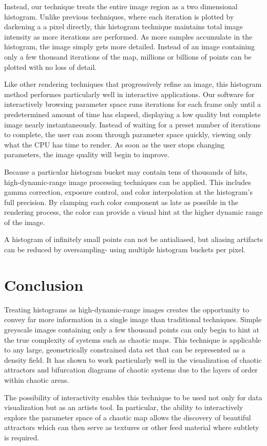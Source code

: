 \documentclass{acmsiggraph}
\begin{document}
Instead, our technique treats the entire image region as a two dimensional
histogram. Unlike previous techniques, where each iteration is plotted by
darkening a a pixel directly, this histogram technique maintains total image
intensity as more iterations are performed. As more samples accumulate in the
histogram, the image simply gets more detailed. Instead of an image containing
only a few thousand iterations of the map, millions or billions of points can
be plotted with no loss of detail.

Like other rendering techniques that progressively refine an image, this
histogram method performes particularly well in interactive applications.
Our software for interactively browsing parameter space runs iterations
for each frame only until a predetermined amount of time has elapsed,
displaying a low quality but complete image nearly instantaneously.
Instead of waiting for a preset number of iterations to complete, the user
can zoom through parameter space quickly, viewing only what the CPU has time
to render. As soon as the user stops changing parameters, the image quality
will begin to improve.

Because a particular histogram bucket may contain tens of thousands of hits,
high-dynamic-range image processing techniques can be applied. This includes
gamma correction, exposure control, and color interpolation at the histogram's
full precision. By clamping each color component as late as possible in the
rendering process, the color can provide a visual hint at the higher
dynamic range of the image.

A histogram of infinitely small points can not be antialiased, but aliasing
artifacts can be reduced by oversampling- using multiple histogram buckets
per pixel.

\section{Conclusion}
Treating histograms as high-dynamic-range images creates the opportunity to
convey far more information in a single image than traditional techniques.
Simple greyscale images containing only a few thousand points can only begin
to hint at the true complexity of systems such as chaotic maps. This technique
is applicable to any large, geometrically constrained data set that can be
represented as a density field. It has shown to work particularly well in
the visualization of chaotic attractors and bifurcation diagrams of chaotic
systems due to the layers of order within chaotic areas.

The possibility of interactivity enables this technique to be used not only
for data visualization but as an artists tool. In particular, the ability
to interactively explore the parameter space of a chaotic map allows the
discovery of beautiful attractors which can then serve as textures or other
feed material where subtlety is required.
\end{document}
